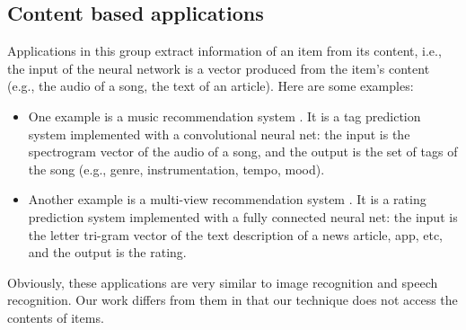 \documentclass[letterpaper]{article}
\begin{document}
\subsection{Content based applications}
Applications in this group extract information of an item from its content, 
i.e., the input of the neural network is a vector produced from the item's 
content (e.g., the audio of a song, the text of an article). Here are some 
examples:
\begin{itemize}
	\item One example is a music recommendation system \cite{van2013deep}. 
	It is a tag prediction system implemented with a convolutional neural net: 
	the input is the spectrogram vector of the audio of a song, and the output 
	is the set of tags of the song (e.g., genre, instrumentation, tempo, mood).
	\item Another example is a multi-view recommendation system 
	\cite{elkahky2015multi}. 
	It is a rating prediction system implemented with a fully connected neural 
	net: the input is the letter tri-gram vector of the text description of a 
	news article, app, etc, and the output is the rating.
\end{itemize}
Obviously, these applications are very similar to image recognition and speech 
recognition.
Our work differs from them in that our technique does not access the contents 
of items.
\end{document}
